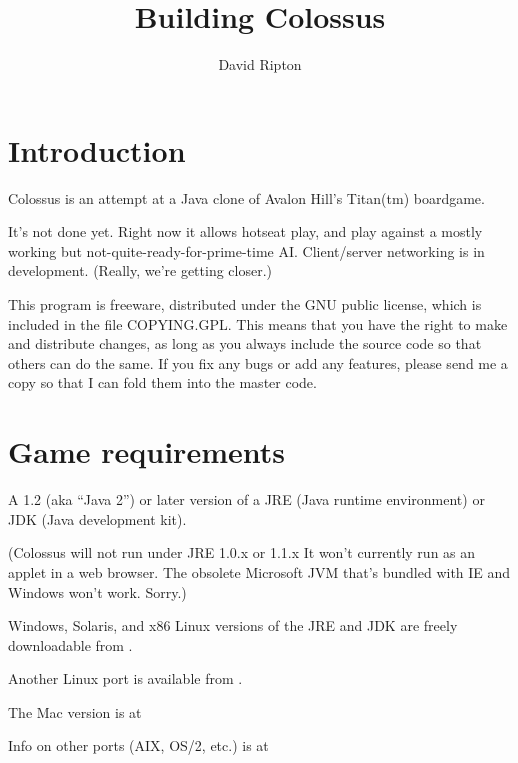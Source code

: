 \documentclass{article}
\begin{document}

\title{Building Colossus}

\author{David Ripton}

\maketitle

\section*{Introduction}

Colossus is an attempt at a Java clone of Avalon Hill's Titan(tm) boardgame.

It's not done yet. Right now it allows hotseat play, and play against a
mostly working but not-quite-ready-for-prime-time AI. Client/server 
networking is in development. (Really, we're getting closer.)

This program is freeware, distributed under the GNU public license, which
is included in the file COPYING.GPL. This means that you have the right to
make and distribute changes, as long as you always include the source code
so that others can do the same. If you fix any bugs or add any features,
please send me a copy so that I can fold them into the master code.

\section{Game requirements}

A 1.2 (aka ``Java 2'') or later version of a JRE (Java runtime environment) 
or JDK (Java development kit). 

(Colossus will not run under JRE 1.0.x or 1.1.x It won't currently run 
as an applet in a web browser. The obsolete Microsoft JVM that's bundled
with IE and Windows won't work. Sorry.)

Windows, Solaris, and x86 Linux versions of the JRE and JDK are freely 
downloadable from .

Another Linux port is available from
.

The Mac version is at

Info on other ports (AIX, OS/2, etc.) is at 
\end{document}

